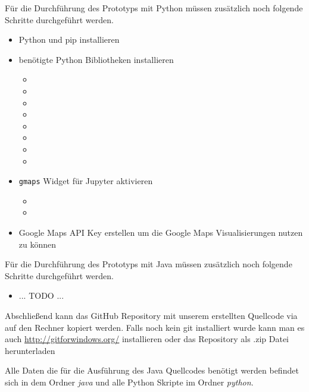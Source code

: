 Für die Durchführung des Prototyps mit Python müssen zusätzlich noch folgende Schritte durchgeführt werden.
\begin{itemize}
  \item Python und pip installieren
  \item benötigte Python Bibliotheken installieren
  \begin{itemize}
    \item {}
    \item {}
    \item {}
    \item {}
    \item {}
    \item {}
    \item {}
    \item {}
  \end{itemize}
  \item \texttt{gmaps} Widget für Jupyter aktivieren
  \begin{itemize}
    \item {}
    \item {}
  \end{itemize}
  \item Google Maps API Key erstellen um die Google Maps Visualisierungen nutzen zu können
\end{itemize}

Für die Durchführung des Prototyps mit Java müssen zusätzlich noch folgende Schritte durchgeführt werden.
\begin{itemize}
  \item ... TODO ...
\end{itemize}

Abschließend kann das GitHub Repository mit unserem erstellten Quellcode via 
auf den Rechner kopiert werden.
Falls noch kein git installiert wurde kann man es auch \hyperref[hier]{http://gitforwindows.org/} installieren oder das Repository als .zip Datei herunterladen

Alle Daten die für die Ausführung des Java Quellcodes benötigt werden befindet sich in dem Ordner \textit{java}
und alle Python Skripte im Ordner \textit{python}.


